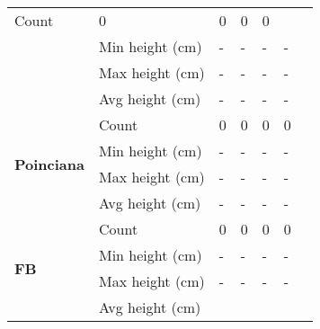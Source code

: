 \begin{longtable}{|p{2cm}|p{2cm}|p{2cm}|p{2cm}|p{2cm}|p{2cm}|p{2cm}|}
						\multicolumn{1}{l|}{Count} & 
						\multicolumn{1}{l|}{0} & 
						\multicolumn{1}{l|}{0} &
						\multicolumn{1}{l|}{0} & 
						\multicolumn{1}{l|}{0} \\\cline{2-7} &
						\multicolumn{1}{l|}{Min height (cm)} & 
						\multicolumn{1}{l|}{-} & 
						\multicolumn{1}{l|}{-} &
						\multicolumn{1}{l|}{-} & 
						\multicolumn{1}{l|}{-} \\\cline{2-7} &
						\multicolumn{1}{l|}{Max height (cm)} & 
						\multicolumn{1}{l|}{-} & 
						\multicolumn{1}{l|}{-} &
						\multicolumn{1}{l|}{-} & 
						\multicolumn{1}{l|}{-} \\\cline{2-7} &
						\multicolumn{1}{l|}{Avg height (cm)} & 
						\multicolumn{1}{l|}{-} & 
						\multicolumn{1}{l|}{-} &
						\multicolumn{1}{l|}{-} & 
						\multicolumn{1}{l|}{-} \\\cline{2-7}
		\hline    
		\multirow{4}{*}{\textbf{Poinciana}} & 
						\multicolumn{1}{l|}{Count} & 
						\multicolumn{1}{l|}{0} & 
						\multicolumn{1}{l|}{0} &
						\multicolumn{1}{l|}{0} & 
						\multicolumn{1}{l|}{0} \\\cline{2-7} &
						\multicolumn{1}{l|}{Min height (cm)} & 
						\multicolumn{1}{l|}{-} & 
						\multicolumn{1}{l|}{-} &
						\multicolumn{1}{l|}{-} & 
						\multicolumn{1}{l|}{-} \\\cline{2-7} &
						\multicolumn{1}{l|}{Max height (cm)} & 
						\multicolumn{1}{l|}{-} & 
						\multicolumn{1}{l|}{-} &
						\multicolumn{1}{l|}{-} & 
						\multicolumn{1}{l|}{-} \\\cline{2-7} &
						\multicolumn{1}{l|}{Avg height (cm)} & 
						\multicolumn{1}{l|}{-} & 
						\multicolumn{1}{l|}{-} &
						\multicolumn{1}{l|}{-} & 
						\multicolumn{1}{l|}{-} \\\cline{2-7}
		\hline    
		\multirow{4}{*}{\textbf{FB}} & 
						\multicolumn{1}{l|}{Count} & 
						\multicolumn{1}{l|}{0} & 
						\multicolumn{1}{l|}{0} &
						\multicolumn{1}{l|}{0} & 
						\multicolumn{1}{l|}{0} \\\cline{2-7} &
						\multicolumn{1}{l|}{Min height (cm)} & 
						\multicolumn{1}{l|}{-} & 
						\multicolumn{1}{l|}{-} &
						\multicolumn{1}{l|}{-} & 
						\multicolumn{1}{l|}{-} \\\cline{2-7} &
						\multicolumn{1}{l|}{Max height (cm)} & 
						\multicolumn{1}{l|}{-} & 
						\multicolumn{1}{l|}{-} &
						\multicolumn{1}{l|}{-} & 
						\multicolumn{1}{l|}{-} \\\cline{2-7} &
						\multicolumn{1}{l|}{Avg height (cm)} & 

\end{longtable}
